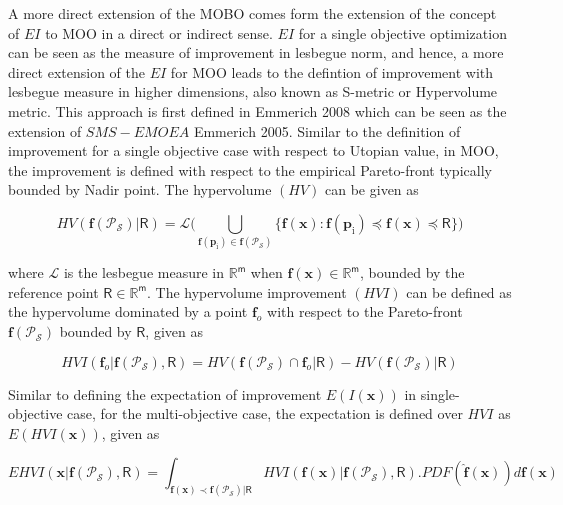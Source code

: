 A more direct extension of the MOBO comes form the extension of the concept of $EI$ to MOO in a direct or indirect sense.
$EI$ for a single objective optimization can be seen as the measure of improvement in lesbegue norm, and hence, a more direct extension of the $EI$ for MOO leads to the defintion of improvement with lesbegue measure in higher dimensions, also known as S-metric or Hypervolume metric. This approach is first defined in {\color{red} Emmerich 2008} which can be seen as the extension of $SMS-EMOEA$ {\color{red} Emmerich 2005}.  Similar to the definition of improvement for a single objective case with respect to Utopian value, in MOO, the improvement is defined with respect to the empirical Pareto-front typically bounded by Nadir point.  The hypervolume $(HV)$ can be given as

\begin{equation}
{HV}(\bm f(\mathscr{P}_{\mathcal{S}})| \bm{\mathsf{R}})= \mathscr{L}\bigg(\bigcup_{\bm f(\bm{p}_\mathrm{i})\in \bm f(\mathscr{P}_{\mathcal{S}})}\{ \bm f(\bm x):\bm f(\bm{p}_\mathrm{i}) \preceq \bm f(\bm x) \preceq \bm{\mathsf{R}} \}\bigg)
\end{equation}

where $ \mathscr{L}$ is the lesbegue measure in $\mathbb{R}^{\mathsf{m}}$ when $\bm f(\bm x) \in \mathbb{R}^{\mathsf{m}}$, bounded by the reference point $\bm{\mathsf{R}} \in \mathbb{R}^{\mathsf{m}}$. The hypervolume improvement $({HVI})$ can be defined as the hypervolume dominated by a point $\bm f_o$ with respect to the Pareto-front $\bm f(\mathscr{P}_{\mathcal{S}})$ bounded by $\bm{\mathsf{R}}$, given as


\begin{equation}
{HVI}(\bm  f_o |\bm f(\mathscr{P}_{\mathcal{S}}), \mathsf{R}) = {HV}(\bm f(\mathscr{P}_{\mathcal{S}}) \cap \bm  f_o | \mathsf{R}) - {HV}(\bm f(\mathscr{P}_{\mathcal{S}}) | \bm{\mathsf{R}})
\end{equation}

Similar to defining the expectation of improvement $E(I(\bm x)) $ in single-objective case, for the multi-objective case, the expectation is defined over ${HVI}$ as $E({HVI}(\bm x))$, given as

\begin{equation}
{EHVI}(\bm{x}|\bm f(\mathscr{P}_{\mathcal{S}}), \bm{\mathsf{R}}) = \int_{\bm{{f}}(\bm x) \prec \bm f(\mathscr{P}_{\mathcal{S}})|\bm{\mathsf{R}}} {HVI}(\bm{{f}}(\bm x) |\bm f(\mathscr{P}_{\mathcal{S}}), \bm{\mathsf{R}}). PDF(\bm{\hat{f}}({\bm x})) d \bm{{f}}{(\bm x)}
\end{equation}

